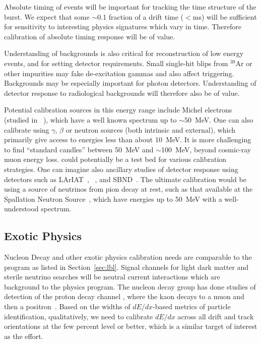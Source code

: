 Absolute timing of events will be important for tracking the time structure of the burst. We expect that some $\sim$\num{0.1} fraction of a drift time ($<$\si{\ms}) will be sufficient for sensitivity to interesting physics signatures which vary in time. Therefore calibration of absolute timing response will be of value.

Understanding of backgrounds is also critical for reconstruction of low energy events, and for setting detector requirements. Small single-hit blips from $^{39}$Ar or other impurities may fake de-excitation gammas and also affect triggering. Backgrounds may be especially important for photon detectors.  Understanding of detector response to radiological backgrounds will therefore also be of value.

Potential calibration sources in this energy range include Michel electrons (studied in ~\cite{Acciarri:2017sjy}), which have a well known spectrum up to $\sim$50~MeV. One can also calibrate using $\gamma$, $\beta$ or neutron sources (both intrinsic and external), which primarily give access to energies less than about 10~MeV. It is more challenging to find ``standard candles'' between 50~MeV and $\sim$\SI{100}{\MeV}, beyond cosmic-ray muon energy loss.  could potentially be a test bed for various calibration strategies. One can imagine also ancillary studies of detector response using detectors such as LArIAT~\cite{Cavanna:2014iqa}, ~\cite{Acciarri:2016smi}, and SBND~\cite{Antonello:2015lea}. The ultimate calibration would be using a source of neutrinos from pion decay at rest, such as that available at the Spallation Neutron Source~\cite{Bolozdynya:2012xv}, which have energies up to \SI{50}{\MeV} with a well-understood spectrum.

\subsection{Exotic Physics}\label{sec:exotica}

Nucleon Decay and other exotic physics calibration needs are comparable to the  program as listed in Section~\ref{sec:lbl}. Signal channels for light dark matter and sterile neutrino searches will be neutral current interactions which are background to the  physics program. The nucleon decay group has done studies of detection of the proton decay channel \ptoknubar, %
where the kaon decays to a muon and then a positron~\cite{protondecaywidths}. Based on the widths of $dE/dx$-based metrics of particle identification, qualitatively, we need to calibrate $dE/dx$ across all drift and track orientations at the few percent level or better, which is a similar target of interest as the  effort.

